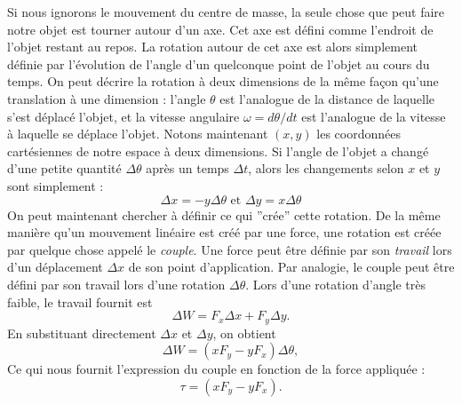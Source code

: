 Si nous ignorons le mouvement du centre de masse, la seule chose que peut faire notre objet est tourner autour d'un axe. Cet axe est défini comme l'endroit de l'objet restant au repos. La rotation autour de cet axe est alors simplement définie par l'évolution de l'angle d'un quelconque point de l'objet au cours du temps. On peut décrire la rotation à deux dimensions de la même façon qu'une translation à une dimension : l'angle $\theta$ est l'analogue de la distance de laquelle s'est déplacé l'objet, et la vitesse angulaire $\omega=d\theta/dt$ est l'analogue de la vitesse à laquelle se déplace l'objet. Notons maintenant $(x,y)$ les coordonnées cartésiennes de notre espace à deux dimensions. Si l'angle de l'objet a changé d'une petite quantité $\Delta\theta$ après un temps $\Delta t$, alors les changements selon $x$ et $y$ sont simplement :
\begin{equation*}
\Delta x = -y\Delta \theta \mbox{ et } \Delta y = x\Delta \theta
\end{equation*}
On peut maintenant chercher à définir ce qui ''crée'' cette rotation. De la même manière qu'un mouvement linéaire est créé par une force, une rotation est créée par quelque chose appelé le \textit{couple}. Une force peut être définie par son \textit{travail} lors d'un déplacement $\Delta x$ de son point d'application. Par analogie, le couple peut être défini par son travail lors d'une rotation $\Delta \theta$. Lors d'une rotation d'angle très faible, le travail fournit est 
\begin{equation*}
\Delta W = F_x \Delta x + F_y \Delta y.
\end{equation*}
En substituant directement $\Delta x$ et $\Delta y$, on obtient
\begin{equation*}
\Delta W = (xF_y-yF_x)\Delta \theta,
\end{equation*}
Ce qui nous fournit l'expression du couple en fonction de la force appliquée :
\begin{equation*}
\tau = (xF_y-yF_x).
\end{equation*}

